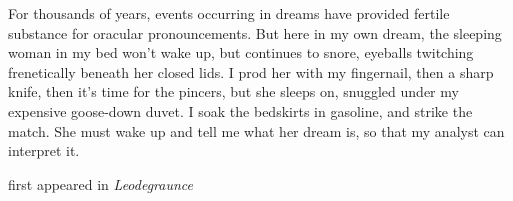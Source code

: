
For thousands of years, events occurring in dreams have provided fertile
substance for oracular pronouncements. But here in my own dream, the
sleeping woman in my bed won't wake up, but continues to snore, eyeballs
twitching frenetically beneath her closed lids. I prod her with my
fingernail, then a sharp knife, then it's time for the pincers, but she
sleeps on, snuggled under my expensive goose-down duvet. I soak the
bedskirts in gasoline, and strike the match. She must wake up and tell
me what her dream is, so that my analyst can interpret it.

first appeared in \emph{Leodegraunce}
